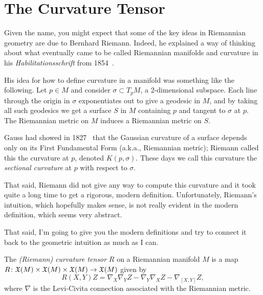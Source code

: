 
\section{The Curvature Tensor}
\label{sec:curvature tensor}

Given the name, you might expect that some of the key ideas in Riemannian geometry are due to Bernhard Riemann. Indeed, he explained a way of thinking about what eventually came to be called Riemannian manifolds and curvature in his \emph{Habilitationsschrift} from 1854~\cite{riemannHypothesesWhichLie2016}.

His idea for how to define curvature in a manifold was something like the following. Let $p \in M$ and consider $\sigma \subset T_pM$, a 2-dimensional subspace. Each line through the origin in $\sigma$ exponentiates out to give a geodesic in $M$, and by taking all such geodesics we get a surface $S$ in $M$ containing $p$ and tangent to $\sigma$ at $p$. The Riemannian metric on $M$ induces a Riemannian metric on $S$.

Gauss had showed in 1827~\cite{gaussGeneralInvestigationsCurved2005} that the Gaussian curvature of a surface depends only on its First Fundamental Form (a.k.a., Riemannian metric); Riemann called this the curvature at $p$, denoted $K(p,\sigma)$. These days we call this curvature the \emph{sectional curvature} at $p$ with respect to $\sigma$.

That said, Riemann did not give any way to compute this curvature and it took quite a long time to get a rigorous, modern definition. Unfortunately, Riemann's intuition, which hopefully makes sense, is not really evident in the modern definition, which seems very abstract. 

That said, I'm going to give you the modern definitions and try to connect it back to the geometric intuition as much as I can.

\begin{definition}\label{def:curvature tensor}
	The \emph{(Riemann) curvature tensor} $R$ on a Riemannian manifold $M$ is a map $R \colon\thinspace\! \mathfrak{X}(M) \times \mathfrak{X}(M) \times \mathfrak{X}(M) \to \mathfrak{X}(M)$ given by
	\begin{equation}\label{eq:curvature tensor}
		R(X,Y)Z = \nabla_X \nabla_Y Z - \nabla_Y \nabla_X Z - \nabla_{[X,Y]}Z,
	\end{equation}
	where $\nabla$ is the Levi-Civita connection associated with the Riemannian metric.
\end{definition}

